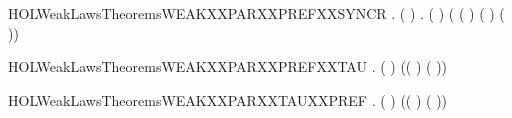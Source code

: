 \newcommand{\HOLWeakLawsTheoremsWEAKXXPARXXPREFXXNOXXSYNCR}{\UseVerbatim{HOLWeakLawsTheoremsWEAKXXPARXXPREFXXNOXXSYNCR}}
\begin{SaveVerbatim}{HOLWeakLawsTheoremsWEAKXXPARXXPREFXXSYNCR}
\HOLTokenTurnstile{} \HOLSymConst{\HOLTokenForall{}} .
       ( \HOLSymConst{=}  ) \HOLSymConst{\HOLTokenImp{}}
       \HOLSymConst{\HOLTokenForall{}} .
            (  \HOLSymConst{\ensuremath{\parallel}}  )
             ( ( \HOLSymConst{\ensuremath{\parallel}}  ) \HOLSymConst{\ensuremath{+}}
               (  \HOLSymConst{\ensuremath{\parallel}} ) \HOLSymConst{\ensuremath{+}} \HOLConst{\ensuremath{\tau}}( \HOLSymConst{\ensuremath{\parallel}} ))
\end{SaveVerbatim}
\newcommand{\HOLWeakLawsTheoremsWEAKXXPARXXPREFXXSYNCR}{\UseVerbatim{HOLWeakLawsTheoremsWEAKXXPARXXPREFXXSYNCR}}
\begin{SaveVerbatim}{HOLWeakLawsTheoremsWEAKXXPARXXPREFXXTAU}
\HOLTokenTurnstile{} \HOLSymConst{\HOLTokenForall{}}  .
        ( \HOLSymConst{\ensuremath{\parallel}} \HOLConst{\ensuremath{\tau}})
         (( \HOLSymConst{\ensuremath{\parallel}} \HOLConst{\ensuremath{\tau}}) \HOLSymConst{\ensuremath{+}} \HOLConst{\ensuremath{\tau}}( \HOLSymConst{\ensuremath{\parallel}} ))
\end{SaveVerbatim}
\newcommand{\HOLWeakLawsTheoremsWEAKXXPARXXPREFXXTAU}{\UseVerbatim{HOLWeakLawsTheoremsWEAKXXPARXXPREFXXTAU}}
\begin{SaveVerbatim}{HOLWeakLawsTheoremsWEAKXXPARXXTAUXXPREF}
\HOLTokenTurnstile{} \HOLSymConst{\HOLTokenForall{}}  .
        (\HOLConst{\ensuremath{\tau}} \HOLSymConst{\ensuremath{\parallel}} )
         (\HOLConst{\ensuremath{\tau}}( \HOLSymConst{\ensuremath{\parallel}} ) \HOLSymConst{\ensuremath{+}} (\HOLConst{\ensuremath{\tau}} \HOLSymConst{\ensuremath{\parallel}} ))
\end{SaveVerbatim}
